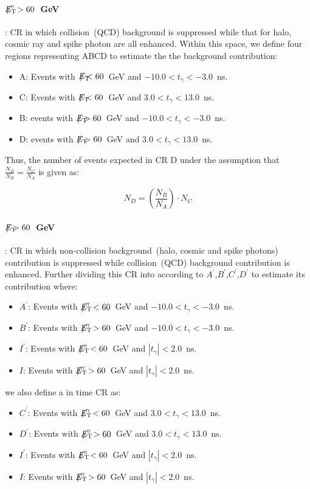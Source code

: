 \paragraph*{${E_{\mathrm{T}}\hspace{-1.2em}/}^{\gamma} > 60$~GeV } : CR in which collision~(QCD) background is suppressed while that for halo, cosmic ray and spike photon are all enhanced.
Within this space, we define four regions representing ABCD to estimate the the background contribution:
\begin{itemize}
\item A: Events with ${E_{\mathrm{T}}\hspace{-1.2em}/} < 60$~GeV and $ -10.0 < t_{\gamma} < -3.0$~ns.
\item C: Events with ${E_{\mathrm{T}}\hspace{-1.2em}/} < 60$~GeV and $3.0 < t_{\gamma} < 13.0$~ns.
\item B: events with ${E_{\mathrm{T}}\hspace{-1.2em}/} > 60$~GeV and $-10.0 < t_{\gamma} < -3.0$~ns.
\item D: events with ${E_{\mathrm{T}}\hspace{-1.2em}/} > 60$~GeV and $3.0 < t_{\gamma} <  13.0$~ns.
\end{itemize}
Thus, the number of events expected in CR D under the assumption that $\frac{N_{D}}{N_{B}} = \frac{N_{C}}{N_{A}}$  is given as:

\begin{equation}
N_{D} = \left(\frac{N_{B}}{N_{A}} \right)\cdot N_{C}
\end{equation}

\paragraph*{${E_{\mathrm{T}}\hspace{-1.2em}/} > 60$~GeV }: CR in which non-collision background~(halo, cosmic and spike photons) contribution is suppressed while collision~(QCD) background contribution is enhanced.
Further dividing this CR into according to $A^{\prime}$,$B^{\prime}$,$C^{\prime}$,$D^{\prime}$ to estimate its contribution where:
\begin{itemize}
\item $A^{\prime}$: Events with ${E_{\mathrm{T}}\hspace{-1.2em}/}^{\gamma} < 60$~GeV and $-10.0 < t_{\gamma} < -3.0$~ns.
\item $B^{\prime}$: Events with ${E_{\mathrm{T}}\hspace{-1.2em}/}^{\gamma} > 60$~GeV and $-10.0 < t_{\gamma} < -3.0$~ns.
\item $I^{\prime}$: Events with ${E_{\mathrm{T}}\hspace{-1.2em}/}^{\gamma} < 60$~GeV and $|t_{\gamma}| < 2.0$~ns.
\item $I$: Events with ${E_{\mathrm{T}}\hspace{-1.2em}/}^{\gamma} > 60$~GeV and $|t_{\gamma}| < 2.0$~ns.
\end{itemize}
we also define a in time CR as:
\begin{itemize}
\item $C^{\prime}$: Events with ${E_{\mathrm{T}}\hspace{-1.2em}/}^{\gamma} < 60$~GeV and $ 3.0 < t_{\gamma} <  13.0$~ns.
 \item $D^{\prime}$: Events with ${E_{\mathrm{T}}\hspace{-1.2em}/}^{\gamma} > 60$~GeV and $3.0 < t_{\gamma} <  13.0$~ns.
 \item $I^{\prime}$: Events with ${E_{\mathrm{T}}\hspace{-1.2em}/}^{\gamma} < 60$~GeV and $|t_{\gamma}| < 2.0$~ns.
\item $I$: Events with ${E_{\mathrm{T}}\hspace{-1.2em}/}^{\gamma} > 60$~GeV and $|t_{\gamma}| < 2.0$~ns.
\end{itemize}

